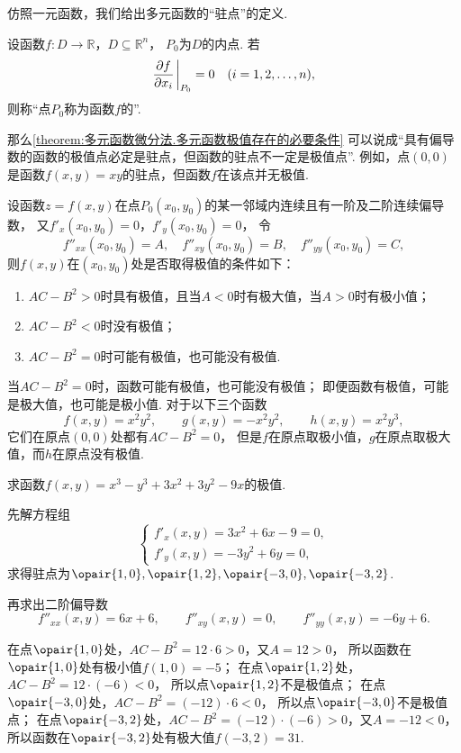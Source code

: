 仿照一元函数，我们给出多元函数的“驻点”的定义.
\begin{definition}
设函数\(f\colon D \to \mathbb{R}\)，\(D \subseteq \mathbb{R}^n\)，
\(P_0\)为\(D\)的内点.
若\[
	\pdv{f}{x_i}\eval_{P_0}=0
	\quad(i=1,2,\dotsc,n),
\]
则称“点\(P_0\)称为函数\(f\)的”.
\end{definition}
那么\cref{theorem:多元函数微分法.多元函数极值存在的必要条件}
可以说成“具有偏导数的函数的极值点必定是驻点，但函数的驻点不一定是极值点”.
例如，点\((0,0)\)是函数\(f(x,y) = xy\)的驻点，但函数\(f\)在该点并无极值.

\begin{theorem}[充分条件]\label{theorem:多元函数微分法.多元函数极值存在的充分条件}
设函数\(z=f(x,y)\)在点\(P_0(x_0,y_0)\)的某一邻域内连续且有一阶及二阶连续偏导数，
又\(f'_x(x_0,y_0)=0\)，\(f'_y(x_0,y_0)=0\)，
令\[
	f''_{xx}(x_0,y_0)=A, \quad
	f''_{xy}(x_0,y_0)=B, \quad
	f''_{yy}(x_0,y_0)=C,
\]
则\(f(x,y)\)在\((x_0,y_0)\)处是否取得极值的条件如下：
\begin{enumerate}
	\item \(AC-B^2>0\)时具有极值，且当\(A<0\)时有极大值，当\(A>0\)时有极小值；
	\item \(AC-B^2<0\)时没有极值；
	\item \(AC-B^2=0\)时可能有极值，也可能没有极值.
\end{enumerate}
\end{theorem}

\begin{example}
当\(AC-B^2=0\)时，函数可能有极值，也可能没有极值；
即便函数有极值，可能是极大值，也可能是极小值.
对于以下三个函数\[
	f(x,y) = x^2 y^2,
	\qquad
	g(x,y) = -x^2 y^2,
	\qquad
	h(x,y) = x^2 y^3,
\]
它们在原点\((0,0)\)处都有\(AC-B^2=0\)，
但是\(f\)在原点取极小值，\(g\)在原点取极大值，而\(h\)在原点没有极值.
\end{example}

\begin{example}
求函数\(f(x,y) = x^3-y^3+3x^2+3y^2-9x\)的极值.
\begin{solution}
先解方程组\[
	\left\{ \begin{array}{l}
		f'_x(x,y) = 3x^2+6x-9 = 0, \\
		f'_y(x,y) = -3y^2+6y = 0,
	\end{array} \right.
\]
求得驻点为\(\opair{1,0},\opair{1,2},\opair{-3,0},\opair{-3,2}\).

再求出二阶偏导数\[
	f''_{xx}(x,y) = 6x+6,
	\qquad
	f''_{xy}(x,y) = 0,
	\qquad
	f''_{yy}(x,y) = -6y+6.
\]

在点\(\opair{1,0}\)处，\(AC-B^2=12\cdot6>0\)，又\(A=12>0\)，
所以函数在\(\opair{1,0}\)处有极小值\(f(1,0)=-5\)；
在点\(\opair{1,2}\)处，\(AC-B^2=12\cdot(-6)<0\)，
所以点\(\opair{1,2}\)不是极值点；
在点\(\opair{-3,0}\)处，\(AC-B^2=(-12)\cdot6<0\)，
所以点\(\opair{-3,0}\)不是极值点；
在点\(\opair{-3,2}\)处，\(AC-B^2=(-12)\cdot(-6)>0\)，又\(A=-12<0\)，
所以函数在\(\opair{-3,2}\)处有极大值\(f(-3,2)=31\).
\end{solution}
\end{example}

